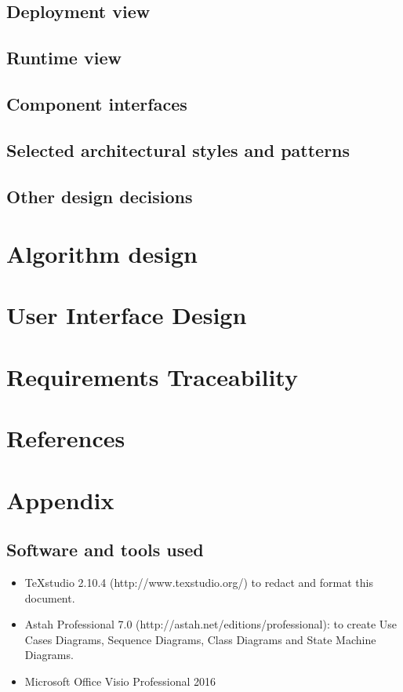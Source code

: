 \documentclass[a4paper,11pt]{report} %
\begin{document}
	\subsection{Deployment view}
	
	\subsection{Runtime view}
	
	\subsection{Component interfaces}
	
	\subsection{Selected architectural styles and patterns}
	
	\subsection{Other design decisions}

	\section{Algorithm design}
	
	\section{User Interface Design}
	
	\section{Requirements Traceability}
	
	\section{References}
	
	\section{Appendix}
	
	\subsection{Software and tools used}
	\begin{itemize}
		\item TeXstudio 2.10.4 (http://www.texstudio.org/) to redact and format this document.
		\item Astah Professional 7.0 (http://astah.net/editions/professional): to create Use
		Cases Diagrams, Sequence Diagrams, Class Diagrams and State Machine	Diagrams.
		\item Microsoft Office Visio Professional 2016
	\end{itemize}
	
\end{document}

